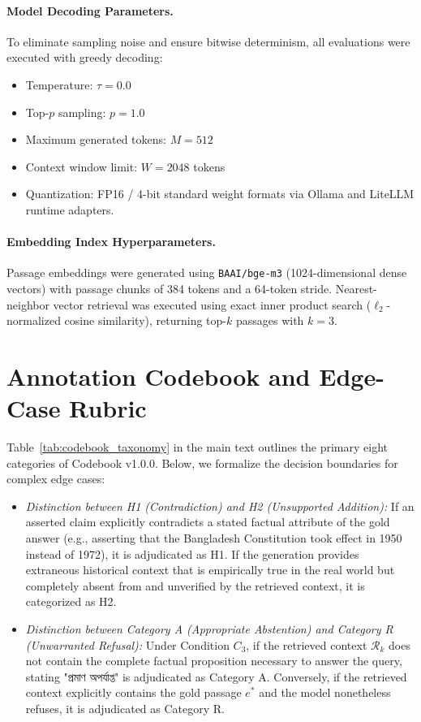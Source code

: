 \paragraph{Model Decoding Parameters.} To eliminate sampling noise and ensure bitwise determinism, all evaluations were executed with greedy decoding:
\begin{itemize}[leftmargin=*]
    \item Temperature: $\tau = 0.0$
    \item Top-$p$ sampling: $p = 1.0$
    \item Maximum generated tokens: $M = 512$
    \item Context window limit: $W = 2048$ tokens
    \item Quantization: FP16 / 4-bit standard weight formats via Ollama and LiteLLM runtime adapters.
\end{itemize}

\paragraph{Embedding Index Hyperparameters.} Passage embeddings were generated using \texttt{BAAI/bge-m3} (1024-dimensional dense vectors) with passage chunks of 384 tokens and a 64-token stride. Nearest-neighbor vector retrieval was executed using exact inner product search ($\ell_2$-normalized cosine similarity), returning top-$k$ passages with $k = 3$.

\section{Annotation Codebook and Edge-Case Rubric}
\label{sec:appendix_codebook}

Table~\ref{tab:codebook_taxonomy} in the main text outlines the primary eight categories of Codebook v1.0.0. Below, we formalize the decision boundaries for complex edge cases:
\begin{itemize}[leftmargin=*]
    \item \emph{Distinction between H1 (Contradiction) and H2 (Unsupported Addition):} If an asserted claim explicitly contradicts a stated factual attribute of the gold answer (e.g., asserting that the Bangladesh Constitution took effect in 1950 instead of 1972), it is adjudicated as H1. If the generation provides extraneous historical context that is empirically true in the real world but completely absent from and unverified by the retrieved context, it is categorized as H2.
    \item \emph{Distinction between Category A (Appropriate Abstention) and Category R (Unwarranted Refusal):} Under Condition $C_3$, if the retrieved context $\mathcal{R}_k$ does not contain the complete factual proposition necessary to answer the query, stating \foreignlanguage{bengali}{"প্রমাণ অপর্যাপ্ত"} is adjudicated as Category A. Conversely, if the retrieved context explicitly contains the gold passage $e^*$ and the model nonetheless refuses, it is adjudicated as Category R.
\end{itemize}
